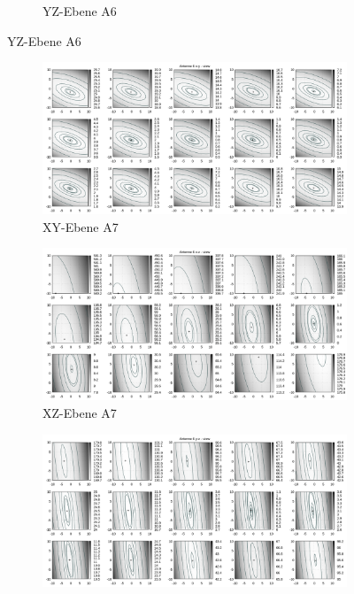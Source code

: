 \begin{appendix}
\begin{landscape}
\begin{figure}[!ht]
\begin{subfigure}[t]{0.5\textwidth}
					\caption{YZ-Ebene A6}
		\end{subfigure}
\end{figure}
%
\newpage
\begin{figure}[!ht]
	\centering
	\begin{subfigure}[t]{0.5\textwidth}
	     \centering
	     \includegraphics[width=\textwidth]{img/fitness/xy/a6.png}
	             \caption{XY-Ebene A7}
	\end{subfigure}
	\begin{subfigure}[t]{0.5\textwidth}
		\centering
	     \includegraphics[width=\textwidth]{img/fitness/xz/a6.png}
				\caption{XZ-Ebene A7}
	\end{subfigure}
	\begin{subfigure}[t]{0.5\textwidth}
			\centering
	   \includegraphics[width=\textwidth]{img/fitness/yz/a6.png}

\end{subfigure}
\end{figure}
\end{landscape}
\end{appendix}
